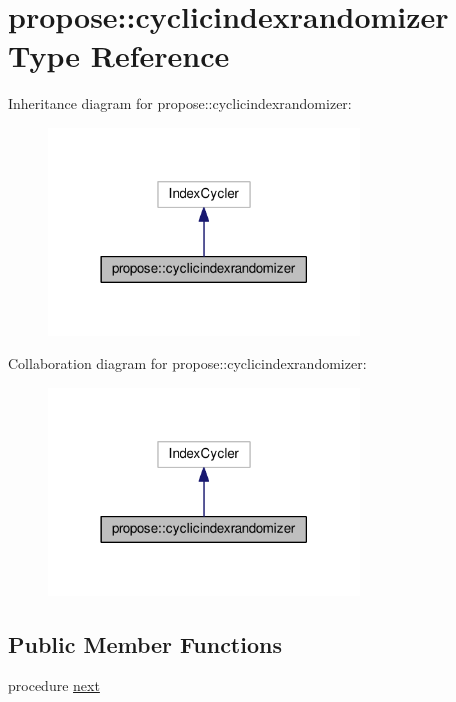 \hypertarget{structpropose_1_1cyclicindexrandomizer}{}\section{propose\+:\+:cyclicindexrandomizer Type Reference}
\label{structpropose_1_1cyclicindexrandomizer}


Inheritance diagram for propose\+:\+:cyclicindexrandomizer\+:
\nopagebreak
\begin{figure}[H]
\begin{center}
\leavevmode
\includegraphics[width=234pt]{structpropose_1_1cyclicindexrandomizer__inherit__graph}
\end{center}
\end{figure}


Collaboration diagram for propose\+:\+:cyclicindexrandomizer\+:
\nopagebreak
\begin{figure}[H]
\begin{center}
\leavevmode
\includegraphics[width=234pt]{structpropose_1_1cyclicindexrandomizer__coll__graph}
\end{center}
\end{figure}
\subsection*{Public Member Functions}
\begin{DoxyCompactItemize}
\item 
procedure \mbox{\hyperlink{structpropose_1_1cyclicindexrandomizer_a95fad74d52a00c5f3ef2497b61b3c75b}{next}}
\end{DoxyCompactItemize}
